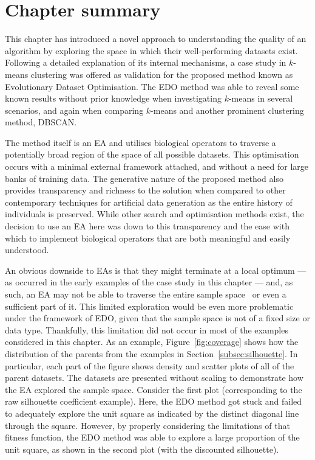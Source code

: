 
\section{Chapter summary}

This chapter has introduced a novel approach to understanding the quality of an
algorithm by exploring the space in which their well-performing datasets exist.
Following a detailed explanation of its internal mechanisms, a case study in
\(k\)-means clustering was offered as validation for the proposed method known
as Evolutionary Dataset Optimisation. The EDO method was able to reveal some
known results without prior knowledge when investigating \(k\)-means in several
scenarios, and again when comparing \(k\)-means and another prominent clustering
method, DBSCAN.

The method itself is an EA and utilises biological operators to traverse a
potentially broad region of the space of all possible datasets. This
optimisation occurs with a minimal external framework attached, and without a
need for large banks of training data. The generative nature of the proposed
method also provides transparency and richness to the solution when compared to
other contemporary techniques for artificial data generation as the entire
history of individuals is preserved. While other search and optimisation methods
exist, the decision to use an EA here was down to this transparency and the ease
with which to implement biological operators that are both meaningful and easily
understood.

An obvious downside to EAs is that they might terminate at a local optimum ---
as occurred in the early examples of the case study in this chapter --- and, as
such, an EA may not be able to traverse the entire sample
space~\cite{Vikhar2016} or even a sufficient part of it. This limited
exploration would be even more problematic under the framework of EDO, given
that the sample space is not of a fixed size or data type. Thankfully, this
limitation did not occur in most of the examples considered in this chapter. As
an example, Figure~\ref{fig:coverage} shows how the distribution of the parents
from the examples in Section~\ref{subsec:silhouette}. In particular, each part
of the figure shows density and scatter plots of all of the parent datasets. The
datasets are presented without scaling to demonstrate how the EA explored the
sample space. Consider the first plot (corresponding to the raw silhouette
coefficient example). Here, the EDO method got stuck and failed to adequately
explore the unit square as indicated by the distinct diagonal line through the
square. However, by properly considering the limitations of that fitness
function, the EDO method was able to explore a large proportion of the unit
square, as shown in the second plot (with the discounted silhouette).

